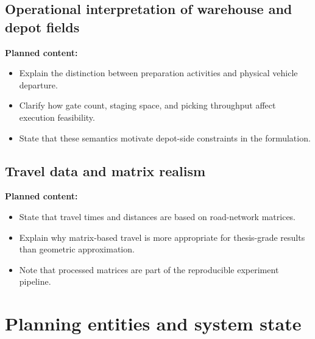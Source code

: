 \subsection{Operational interpretation of warehouse and depot fields}
\label{subsec:chapter03_operational_field_interpretation}

%

\noindent\textbf{Planned content:}
\begin{itemize}
    \item Explain the distinction between preparation activities and physical vehicle departure.
    \item Clarify how gate count, staging space, and picking throughput affect execution feasibility.
    \item State that these semantics motivate depot-side constraints in the formulation.
\end{itemize}

\subsection{Travel data and matrix realism}
\label{subsec:chapter03_travel_data}

%

\noindent\textbf{Planned content:}
\begin{itemize}
    \item State that travel times and distances are based on road-network matrices.
    \item Explain why matrix-based travel is more appropriate for thesis-grade results than geometric approximation.
    \item Note that processed matrices are part of the reproducible experiment pipeline.
\end{itemize}

\section{Planning entities and system state}
\label{sec:chapter03_entities_and_state}

